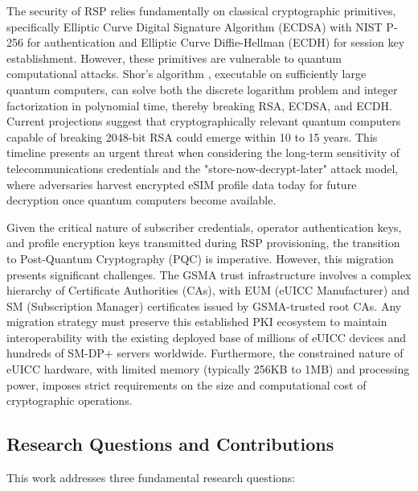 \documentclass{easychair}
\begin{document}
The security of RSP relies fundamentally on classical cryptographic primitives, specifically Elliptic Curve Digital Signature Algorithm (ECDSA) with NIST P-256 for authentication and Elliptic Curve Diffie-Hellman (ECDH) for session key establishment. However, these primitives are vulnerable to quantum computational attacks. Shor's algorithm \cite{NIST_PQC2024}, executable on sufficiently large quantum computers, can solve both the discrete logarithm problem and integer factorization in polynomial time, thereby breaking RSA, ECDSA, and ECDH. Current projections suggest that cryptographically relevant quantum computers capable of breaking 2048-bit RSA could emerge within 10 to 15 years. This timeline presents an urgent threat when considering the long-term sensitivity of telecommunications credentials and the "store-now-decrypt-later" attack model, where adversaries harvest encrypted eSIM profile data today for future decryption once quantum computers become available.

Given the critical nature of subscriber credentials, operator authentication keys, and profile encryption keys transmitted during RSP provisioning, the transition to Post-Quantum Cryptography (PQC) is imperative. However, this migration presents significant challenges. The GSMA trust infrastructure involves a complex hierarchy of Certificate Authorities (CAs), with EUM (eUICC Manufacturer) and SM (Subscription Manager) certificates issued by GSMA-trusted root CAs. Any migration strategy must preserve this established PKI ecosystem to maintain interoperability with the existing deployed base of millions of eUICC devices and hundreds of SM-DP+ servers worldwide. Furthermore, the constrained nature of eUICC hardware, with limited memory (typically 256KB to 1MB) and processing power, imposes strict requirements on the size and computational cost of cryptographic operations.

\subsection{Research Questions and Contributions}

This work addresses three fundamental research questions:
\end{document}
